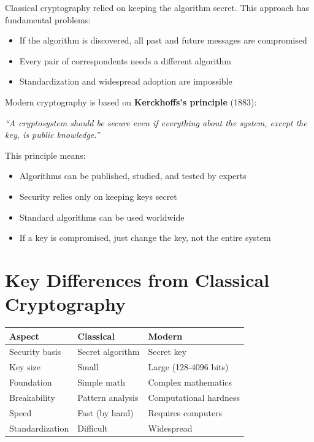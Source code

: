 \documentclass[11pt,a4paper]{report}
\begin{document}
Classical cryptography relied on keeping the algorithm secret. This approach has fundamental problems:
\begin{itemize}
\item If the algorithm is discovered, all past and future messages are compromised
\item Every pair of correspondents needs a different algorithm
\item Standardization and widespread adoption are impossible
\end{itemize}

Modern cryptography is based on \textbf{Kerckhoffs's principle} (1883):

\begin{center}
\emph{``A cryptosystem should be secure even if everything about the system, except the key, is public knowledge.''}
\end{center}

This principle means:
\begin{itemize}
\item Algorithms can be published, studied, and tested by experts
\item Security relies only on keeping keys secret
\item Standard algorithms can be used worldwide
\item If a key is compromised, just change the key, not the entire system
\end{itemize}

\section{Key Differences from Classical Cryptography}

\begin{center}
\begin{tabular}{|l|l|l|}
\hline
\textbf{Aspect} & \textbf{Classical} & \textbf{Modern} \\
\hline
Security basis & Secret algorithm & Secret key \\
Key size & Small & Large (128-4096 bits) \\
Foundation & Simple math & Complex mathematics \\
Breakability & Pattern analysis & Computational hardness \\
Speed & Fast (by hand) & Requires computers \\
Standardization & Difficult & Widespread \\
\hline
\end{tabular}
\end{center}
\end{document}
